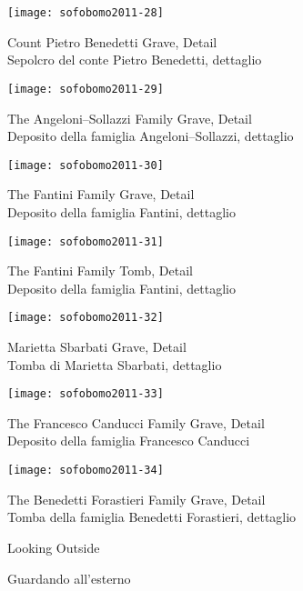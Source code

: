 \begin{center}
\texttt{[image: sofobomo2011-28]}

{Count Pietro Benedetti Grave, Detail}\\
{\footnotesize Sepolcro del conte Pietro Benedetti, dettaglio}
\vspace*{\fill}
\newpage

\texttt{[image: sofobomo2011-29]}

{The Angeloni--Sollazzi Family Grave, Detail}\\
{\footnotesize Deposito della famiglia Angeloni--Sollazzi, dettaglio}
\vspace*{\fill}
\newpage

\texttt{[image: sofobomo2011-30]}

{The Fantini Family Grave, Detail}\\
{\footnotesize Deposito della famiglia Fantini, dettaglio}
\vspace*{\fill}
\newpage

\texttt{[image: sofobomo2011-31]}

{The Fantini Family Tomb, Detail}\\
{\footnotesize Deposito della famiglia Fantini, dettaglio}
\vspace*{\fill}
\newpage

\texttt{[image: sofobomo2011-32]}

{Marietta Sbarbati Grave, Detail}\\
{\footnotesize Tomba di Marietta Sbarbati, dettaglio}
\vspace*{\fill}
\newpage

\texttt{[image: sofobomo2011-33]}

{The Francesco Canducci Family Grave, Detail}\\
{\footnotesize Deposito della famiglia Francesco Canducci}
\vspace*{\fill}
\newpage

\texttt{[image: sofobomo2011-34]}

{The Benedetti Forastieri Family Grave, Detail}\\
{\footnotesize Tomba della famiglia Benedetti Forastieri, dettaglio}
\vspace*{\fill}
\newpage

\pagestyle{empty}
\vspace*{2in}

\hfill{\textsf{\Huge Looking Outside}}

\hfill{\textsf{\LARGE Guardando all'esterno}}


\end{center}
